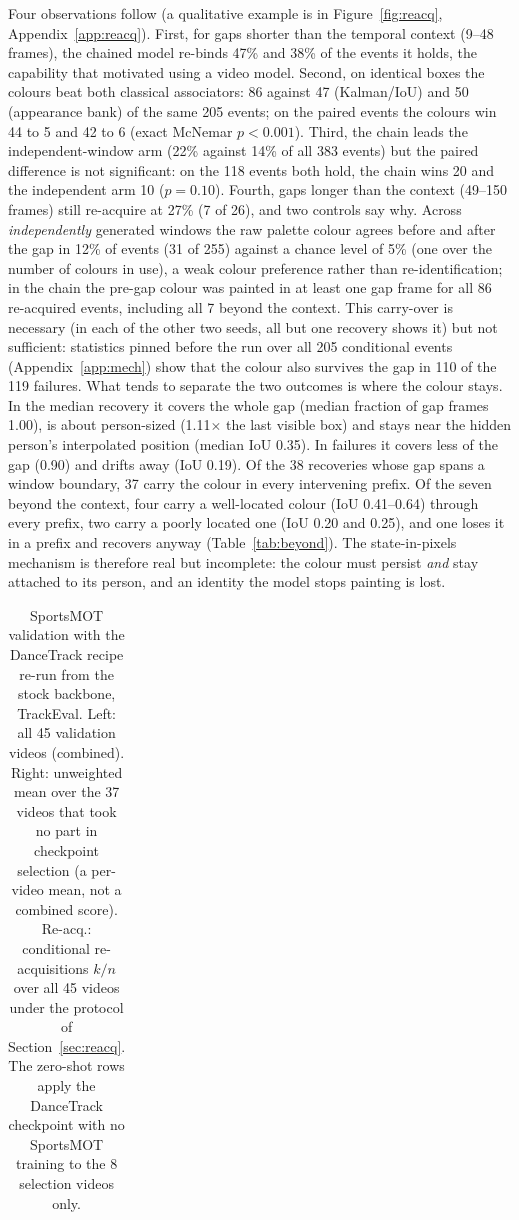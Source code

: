\documentclass{article} %
\newcommand{\rev}[1]{#1}
\begin{document}
Four observations follow (a qualitative example is in Figure~\ref{fig:reacq},
Appendix~\ref{app:reacq}). First, for gaps shorter than the temporal context (9--48 frames),
the chained model re-binds 47\% and 38\% of
the events it holds, the capability that motivated using a video model. Second, on
identical boxes the colours beat both classical associators: 86 against 47 (Kalman/IoU) and
50 (appearance bank) of the same 205 events; on the paired events the colours win \rev{44} to 5
and \rev{42} to 6 (exact McNemar $p<0.001$). Third, the chain leads the independent-window arm
(22\% against 14\% of all 383 events) but the paired difference is not significant: on the
\rev{118} events both hold, the chain wins 20 and the independent arm 10 ($p=0.10$). Fourth, gaps
longer than the context (49--150 frames) still re-acquire at 27\% (7 of 26), and two
controls say why. Across \emph{independently} generated windows the raw palette colour
agrees before and after the gap in 12\% of events (31 of 255) against a chance level of 5\%
(one over the number of colours in use), a weak colour preference rather than
re-identification; in the chain the pre-gap colour was painted in at least one gap frame for
all 86 re-acquired events, including all 7 beyond the context. \rev{This carry-over is
necessary (in each of the other two seeds, all but one recovery shows it) but not
sufficient: statistics pinned before the run over all 205
conditional events (Appendix~\ref{app:mech}) show that the colour also survives the gap in
110 of the 119 failures. What tends to separate the two outcomes is where the colour stays. In the median recovery it
covers the whole gap (median fraction of gap frames 1.00), is about person-sized (1.11$\times$
the last visible box) and stays near the hidden person's interpolated position (median IoU
0.35). In failures it covers less of the gap (0.90) and drifts away (IoU 0.19). Of the 38
recoveries whose gap spans a window boundary, 37 carry the colour in every intervening
prefix. Of the seven beyond the context, four carry a well-located colour (IoU 0.41--0.64)
through every prefix, two carry a poorly located one (IoU 0.20 and 0.25), and one loses it
in a prefix and recovers anyway (Table~\ref{tab:beyond}). The state-in-pixels mechanism is therefore real
but incomplete: the colour must persist \emph{and} stay attached to its person, and an
identity the model stops painting is lost.}


\begin{table}[t]
\centering
\scriptsize
\setlength{\tabcolsep}{3pt}
\caption{SportsMOT validation with the DanceTrack recipe re-run from the stock backbone,
TrackEval. Left: all 45 validation videos (combined). Right: unweighted mean over the 37
videos that took no part in checkpoint selection (a per-video mean, not a combined score).
Re-acq.: conditional re-acquisitions $k/n$ over all 45 videos under the protocol of
Section~\ref{sec:reacq}.
The zero-shot rows apply the DanceTrack checkpoint with no SportsMOT training to the 8
selection videos only.}
\label{tab:sportsmot}
\begin{tabular}{lccccccccc}
\toprule

\end{tabular}
\end{table}
\end{document}
